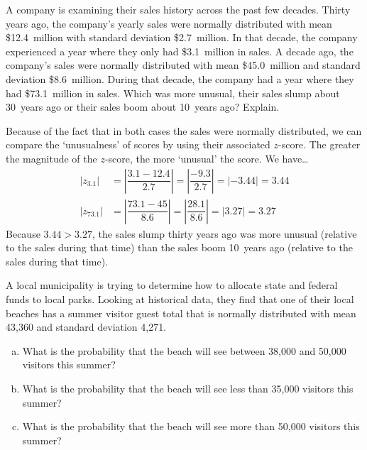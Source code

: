 \documentclass[11pt,letterpaper]{article}
\begin{document}

 A company is examining their sales history across the past few decades. Thirty years ago, the company's yearly sales were normally distributed with mean \$12.4~million with standard deviation \$2.7~million. In that decade, the company experienced a year where they only had \$3.1~million in sales. A decade ago, the company's sales were normally distributed with mean \$45.0~million and standard deviation \$8.6~million. During that decade, the company had a year where they had \$73.1~million in sales. Which was more unusual, their sales slump about 30~years ago or their sales boom about 10~years ago? Explain. \pspace

\sol Because of the fact that in both cases the sales were normally distributed, we can compare the `unusualness' of scores by using their associated $z$-score. The greater the magnitude of the $z$-score, the more `unusual' the score. We have\dots
	\[
	\begin{aligned}
	|z_{3.1}|&= \left| \dfrac{3.1 - 12.4}{2.7} \right| = \left| \dfrac{-9.3}{2.7} \right|= |-3.44|= 3.44 \\[0.3cm]
	|z_{73.1}|&= \left| \dfrac{73.1 - 45}{8.6} \right|= \left| \dfrac{28.1}{8.6} \right|= |3.27|= 3.27
	\end{aligned}
	\]
Because $3.44 > 3.27$, the sales slump thirty years ago was more unusual (relative to the sales during that time) than the sales boom 10~years ago (relative to the sales during that time). 



\newpage



 A local municipality is trying to determine how to allocate state and federal funds to local parks. Looking at historical data, they find that one of their local beaches has a summer visitor guest total that is normally distributed with mean 43,360 and standard deviation 4,271. 
	\begin{enumerate}[(a)]
	\item What is the probability that the beach will see between 38,000 and 50,000 visitors this summer?
	\item What is the probability that the beach will see less than 35,000 visitors this summer?
	\item What is the probability that the beach will see more than 50,000 visitors this summer? 
	\end{enumerate} \pspace
\end{document}
